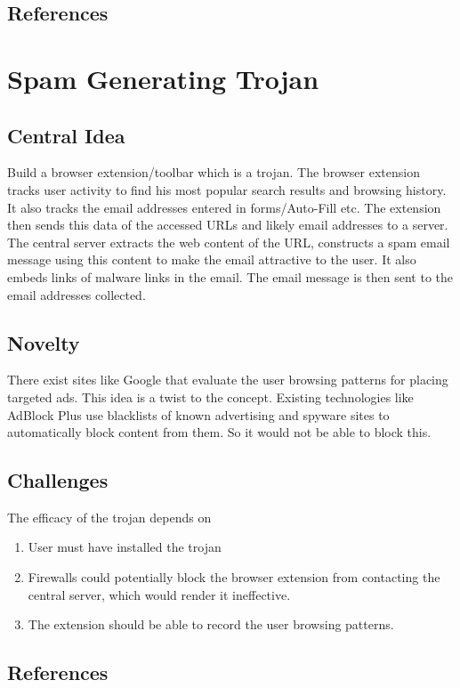 \documentclass[a4paper]{article}
\begin{document}
\subsection{References}

\section{Spam Generating Trojan}
\subsection{Central Idea}
Build a browser extension/toolbar which is a trojan. The browser extension tracks user activity to find his most popular search results and browsing history. It also tracks the email addresses entered in forms/Auto-Fill etc. 
The extension then sends this data of the accessed URLs and likely email addresses to a server. The central server extracts the web content of the URL, constructs a spam email message using this content to make the email attractive to the user. It also embeds links of malware links in the email. The email message is then sent to the email addresses collected.

\subsection{Novelty}
There exist sites like Google that evaluate the user browsing patterns for placing targeted ads. This idea is a twist to the concept. Existing technologies like AdBlock Plus use blacklists of known advertising and spyware sites to automatically block content from them. So it would not be able to block this.

\subsection{Challenges}
The efficacy of the trojan depends on
\begin{enumerate}
\item User must have installed the trojan

\item Firewalls could potentially block the browser extension from contacting the central server, which would render it ineffective.

\item The extension should be able to record the user browsing patterns.
\end{enumerate}

\subsection{References}
\end{document}
